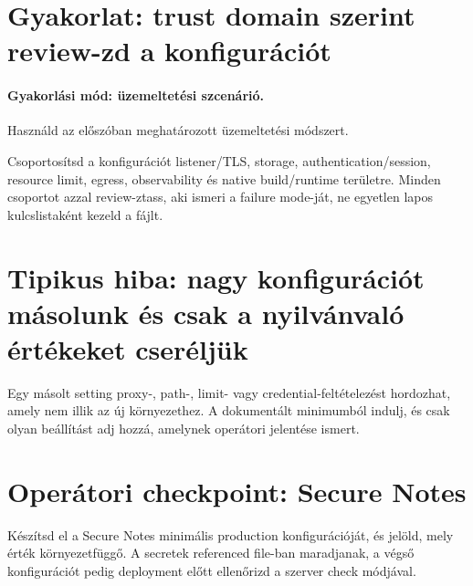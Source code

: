 \section{Gyakorlat: trust domain szerint review-zd a konfigurációt}
\paragraph{Gyakorlási mód: üzemeltetési szcenárió.} Használd az előszóban meghatározott üzemeltetési módszert.

Csoportosítsd a konfigurációt listener/TLS, storage, authentication/session, resource limit, egress, observability és native build/runtime területre. Minden csoportot azzal review-ztass, aki ismeri a failure mode-ját, ne egyetlen lapos kulcslistaként kezeld a fájlt.

\section{Tipikus hiba: nagy konfigurációt másolunk és csak a nyilvánvaló értékeket cseréljük}
Egy másolt setting proxy-, path-, limit- vagy credential-feltételezést hordozhat, amely nem illik az új környezethez. A dokumentált minimumból indulj, és csak olyan beállítást adj hozzá, amelynek operátori jelentése ismert.

\section{Operátori checkpoint: Secure Notes}
Készítsd el a Secure Notes minimális production konfigurációját, és jelöld, mely érték környezetfüggő. A secretek referenced file-ban maradjanak, a végső konfigurációt pedig deployment előtt ellenőrizd a szerver check módjával.
